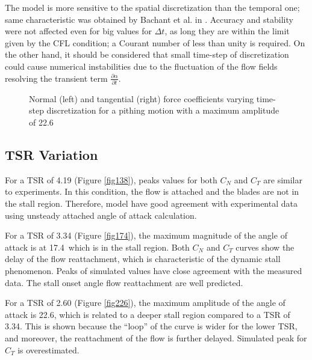 \documentclass[a4paper]{jpconf}
\begin{document}
The model is more sensitive to the spatial discretization than the temporal one;
same characteristic was obtained by Bachant et al. in
\cite{Bachant2016-VAT-ALM}. Accuracy and stability were not affected even for
big values for $\Delta t$, as long they are within the limit given by the CFL
condition; a Courant number of less than unity is required. On the other hand,
it should be considered that small time-step of discretization could cause
numerical instabilities due to the fluctuation of the flow fields resolving the
transient term $\frac{\partial \alpha}{\partial t}$.

\begin{figure}[h]
\begin{minipage}{18pc}
\resizebox{\columnwidth}{!}{}
\end{minipage}\hspace{2pc}%
\begin{minipage}{18pc}
\resizebox{\columnwidth}{!}{}
\end{minipage}
\caption{\label{figdtcoarse}Normal (left) and tangential (right) force coefficients varying time-step discretization for a pithing motion with a maximum amplitude of 22.6\degree\ }
\end{figure}

\subsection{TSR Variation}

For a TSR of 4.19 (Figure \ref{fig138}), peaks values for both $C_N$ and $C_T$
are similar to experiments. In this condition, the flow is attached and the
blades are not in the stall region. Therefore, model have good agreement with
experimental data using unsteady attached angle of attack calculation.

For a TSR of 3.34 (Figure \ref{fig174}), the maximum magnitude of the angle of
attack is at 17.4\degree\ which is in the stall region. Both $C_N$ and $C_T$
curves show the delay of the flow reattachment, which is characteristic of the
dynamic stall phenomenon. Peaks of simulated values have close agreement with
the measured data. The stall onset angle flow reattachment are well predicted.

For a TSR of 2.60 (Figure \ref{fig226}), the maximum amplitude of the angle of
attack is 22.6\degree, which is related to a deeper stall region compared to a
TSR of 3.34. This is shown because the ``loop'' of the curve is wider for the
lower TSR, and moreover, the reattachment of the flow is further delayed.
Simulated peak for $C_T$ is overestimated.
\end{document}
